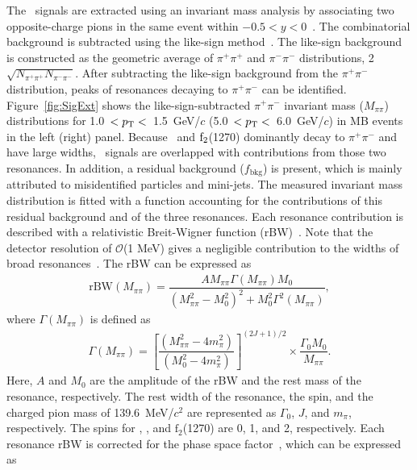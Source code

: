 The \fzero~signals are extracted using an invariant mass analysis by associating two opposite-charge pions in the same event within $-0.5<y<0$~\cite{ALICE:2013wgn}. The combinatorial background is subtracted using the like-sign method~\cite{LIKESIGN}. The like-sign background is constructed as the geometric average of $\pi^{+}\pi^{+}$ and $\pi^{-}\pi^{-}$ distributions, 2$\sqrt{N_{\pi^{+}\pi^{+}}N_{\pi^{-}\pi^{-}}}$. After subtracting the like-sign background from the $\pi^{+}\pi^{-}$ distribution, peaks of resonances decaying to $\pi^{+}\pi^{-}$ can be identified. Figure~\ref{fig:SigExt} shows the like-sign-subtracted $\pi^{+}\pi^{-}$ invariant mass ($M_{\pi\pi}$) distributions for 1.0~$<p_{\rm{T}}<$~1.5~GeV/$c$ (5.0~$<p_{\rm{T}}<$~6.0~GeV/$c$) in MB events in the left (right) panel. Because \rhoz~and $\rm{f}_{2}$(1270) dominantly decay to $\pi^{+}\pi^{-}$ and have large widths, \fzero~signals are overlapped with contributions from those two resonances. In addition, a residual background ($f_{\mathrm{bkg}}$) is present, which is mainly attributed to misidentified particles and mini-jets. The measured invariant mass distribution is fitted with a function accounting for the contributions of this residual background and of the three resonances. Each resonance contribution is described with a relativistic Breit-Wigner function (rBW)~\cite{ALICE:2018qdv, ALICE:2022qnb}. Note that the detector resolution of $\mathcal{O}$(1 MeV) gives a negligible contribution to the widths of broad resonances~\cite{ALICE:2016sak}. The rBW can be expressed as
\begin{eqnarray}
\mathrm{rBW}(M_{\pi\pi}) = \dfrac{AM_{\pi\pi}\Gamma(M_{\pi\pi})M_{0}}{(M_{\pi\pi}^{2}-M_{0}^{2})^{2} + M_{0}^{2}\Gamma^{2}(M_{\pi\pi})},
\label{eq:rBW}
\end{eqnarray}
where $\Gamma(M_{\pi\pi})$ is defined as
\begin{eqnarray}
\Gamma(M_{\pi\pi}) = \left[ \dfrac{ (M_{\pi\pi}^{2} - 4m_{\pi}^{2}) }{ (M_{0}^{2}-4m_{\pi}^{2}) } \right]^{(2J+1)/2} \times \dfrac{\Gamma_{0}M_{0}}{M_{\pi\pi}} .
\label{eq:rBWW}
\end{eqnarray}
Here, $A$ and $M_{0}$ are the amplitude of the rBW and the rest mass of the resonance, respectively. The rest width of the resonance, the spin, and the charged pion mass of 139.6~MeV/$c^{2}$ are represented as $\Gamma_{0}$, $J$, and $m_{\pi}$, respectively. The spins for \fzero, \rhoz, and $\mathrm{f}_{2}$(1270) are 0, 1, and 2, respectively. Each resonance rBW is corrected for the phase space factor~\cite{ALICE:2018qdv}, which can be expressed as
